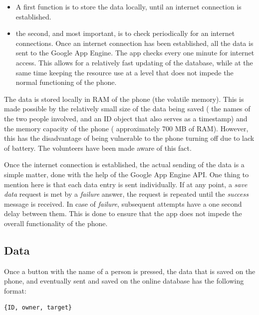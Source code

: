 \begin{itemize}
  \item A first function is to store the data locally, until an internet connection is established.
  \item the second, and most important, is to check periodically for an internet connections. Once an internet connection has been established, all the data is sent to the Google App Engine. The app checks every one minute for internet access. This allows for a relatively fast updating of the database, while at the same time keeping the resource use at a level that does not impede the normal functioning of the phone.
\end{itemize}

The data is stored locally in RAM of the phone (the volatile memory). This is made possible by the relatively small size of the data being saved ( the names of the two people involved, and an ID object that also serves as a timestamp) and the memory capacity of the phone ( approximately 700 MB of RAM). However, this has the disadvantage of being vulnerable to the phone turning off due to lack of battery. The volunteers have been made aware of this fact. 

Once the internet connection is established, the actual sending of the data is a simple matter, done with the help of the Google App Engine API. One thing to mention here is that each data entry is sent individually. If at any point, a \textit{save data} request is met by a \textit{failure} answer, the request is repeated until the \textit{success} message is received. In case of \textit{failure}, subsequent attempts have a one second delay between them. This is done to ensure that the app does not impede the overall functionality of the phone.



\subsection{Data}

Once a button with the name of a person is pressed, the data that is saved on the phone, and eventually sent and saved on the online database has the following format:

\begin{verbatim}
{ID, owner, target}
\end{verbatim}

